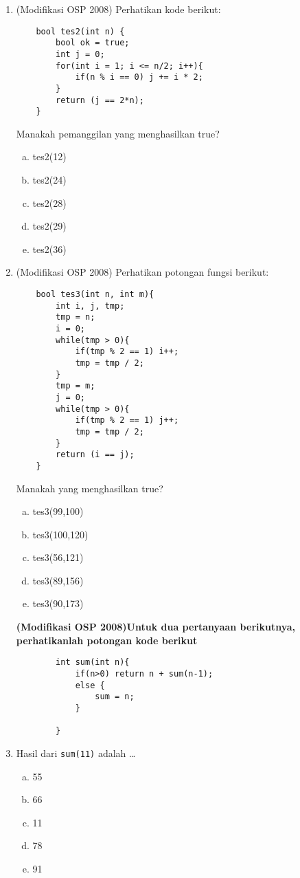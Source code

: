 \begin{enumerate}
\item (Modifikasi OSP 2008) Perhatikan kode berikut:
	\begin{lstlisting}
	bool tes2(int n) {
		bool ok = true;
		int j = 0;
		for(int i = 1; i <= n/2; i++){
			if(n % i == 0) j += i * 2;
		}
		return (j == 2*n);
	}
	\end{lstlisting}
	Manakah pemanggilan yang menghasilkan true?
	\begin{enumerate}[a)]
	\item tes2(12)
	\item tes2(24)
	\item tes2(28)
	\item tes2(29)
	\item tes2(36)
	\end{enumerate}
	
	\item (Modifikasi OSP 2008) Perhatikan potongan fungsi berikut:
	\begin{lstlisting}
	bool tes3(int n, int m){
		int i, j, tmp;
		tmp = n;
		i = 0;
		while(tmp > 0){
			if(tmp % 2 == 1) i++;
			tmp = tmp / 2;
		}
		tmp = m;
		j = 0;
		while(tmp > 0){
			if(tmp % 2 == 1) j++;
			tmp = tmp / 2;
		}
		return (i == j);
	}
	\end{lstlisting}
	Manakah yang menghasilkan true?
	\begin{enumerate}[a)]
	\item tes3(99,100)
	\item tes3(100,120)
	\item tes3(56,121)
	\item tes3(89,156)
	\item tes3(90,173)
	\end{enumerate}
	
	\textbf{(Modifikasi OSP 2008)Untuk dua pertanyaan berikutnya, perhatikanlah potongan kode berikut}
		\begin{lstlisting}
		int sum(int n){
			if(n>0) return n + sum(n-1);
			else {
				sum = n;
			}
			
		}
		\end{lstlisting}
		\item Hasil dari \verb*|sum(11)| adalah \dots
		\begin{enumerate}[a)]
			\item 55
			\item 66
			\item 11
			\item 78
			\item 91
		\end{enumerate}
		

\end{enumerate}
